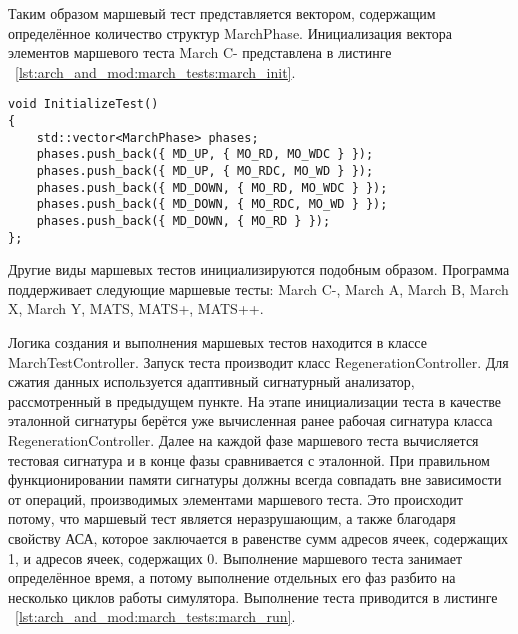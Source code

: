 Таким образом маршевый тест представляется вектором, содержащим определённое количество структур MarchPhase. Инициализация вектора элементов маршевого теста March C- представлена в листинге ~\ref{lst:arch_and_mod:march_tests:march_init}.

\begin{lstlisting}[style=cplusplusstyle, caption={Инициализация вектора элементов маршевого теста March C-}, label=lst:arch_and_mod:march_tests:march_init]
void InitializeTest()
{
    std::vector<MarchPhase> phases;
    phases.push_back({ MD_UP, { MO_RD, MO_WDC } });
    phases.push_back({ MD_UP, { MO_RDC, MO_WD } });
    phases.push_back({ MD_DOWN, { MO_RD, MO_WDC } });
    phases.push_back({ MD_DOWN, { MO_RDC, MO_WD } });
    phases.push_back({ MD_DOWN, { MO_RD } });
};
\end{lstlisting} 

Другие виды маршевых тестов инициализируются подобным образом. Программа поддерживает следующие маршевые тесты: March C-, March A, March B, March X, March Y, MATS, MATS+, MATS++.

Логика создания и выполнения маршевых тестов находится в классе MarchTestController. Запуск теста производит класс RegenerationController. Для сжатия данных используется адаптивный сигнатурный анализатор, рассмотренный в предыдущем пункте. На этапе инициализации теста в качестве эталонной сигнатуры берётся уже вычисленная ранее рабочая сигнатура класса RegenerationController. Далее на каждой фазе маршевого теста вычисляется тестовая сигнатура и в конце фазы сравнивается с эталонной. При правильном функционировании памяти сигнатуры должны всегда совпадать вне зависимости от операций, производимых элементами маршевого теста. Это происходит потому, что маршевый тест является неразрушающим, а также благодаря свойству АСА, которое заключается в равенстве сумм адресов ячеек, содержащих 1, и адресов ячеек, содержащих 0. Выполнение маршевого теста занимает определённое время, а потому выполнение отдельных его фаз разбито на несколько циклов работы симулятора. Выполнение теста приводится в листинге ~\ref{lst:arch_and_mod:march_tests:march_run}.

